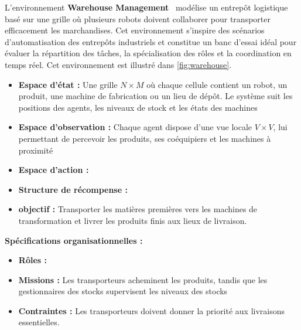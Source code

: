 L'environnement \textbf{Warehouse Management}~\cite{warehouse_management} modélise un entrepôt logistique basé sur une grille où plusieurs robots doivent collaborer pour transporter efficacement les marchandises. Cet environnement s'inspire des scénarios d'automatisation des entrepôts industriels et constitue un banc d'essai idéal pour évaluer la répartition des tâches, la spécialisation des rôles et la coordination en temps réel. Cet environnement est illustré dans \autoref{fig:warehouse}.
%
\begin{itemize}
  \item \textbf{Espace d'état :} Une grille $N \times M$ où chaque cellule contient un robot, un produit, une machine de fabrication ou un lieu de dépôt. Le système suit les positions des agents, les niveaux de stock et les états des machines
  \item \textbf{Espace d'observation :} Chaque agent dispose d'une vue locale $V \times V$, lui permettant de percevoir les produits, ses coéquipiers et les machines à proximité
  \item \textbf{Espace d'action :}
  \item \textbf{Structure de récompense :}
  \item \textbf{objectif :} Transporter les matières premières vers les machines de transformation et livrer les produits finis aux lieux de livraison.
\end{itemize}
%
\textbf{Spécifications organisationnelles :}
\begin{itemize}
  \item \textbf{Rôles :} 
  \item \textbf{Missions :} Les transporteurs acheminent les produits, tandis que les gestionnaires des stocks supervisent les niveaux des stocks
  \item \textbf{Contraintes :} Les transporteurs doivent donner la priorité aux livraisons essentielles.
\end{itemize}

